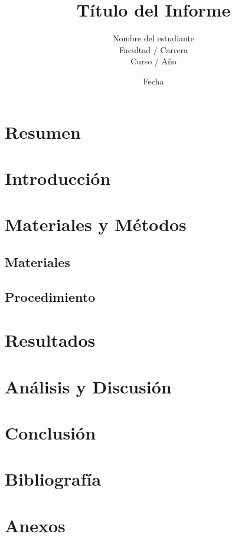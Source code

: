 \documentclass[12pt]{article}
\title{Título del Informe}
\author{Nombre del estudiante \\ Facultad / Carrera \\ Curso / Año}
\date{Fecha}
\begin{document}
\maketitle

\section*{Resumen}

\section{Introducción}

\section{Materiales y Métodos}
\subsection{Materiales}

\subsection{Procedimiento}

\section{Resultados}

\section{Análisis y Discusión}

\section{Conclusión}

\section*{Bibliografía}

\section*{Anexos}
\end{document}
